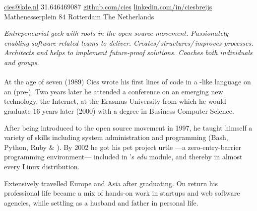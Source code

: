 \documentclass[10pt,a4paper]{article}
\begin{document}
    \sloppy  %
    
    
    
    \nobreakvspace{0.3em}  %
    
    \noindent\href{mailto:cies.at.kde.dot.nl}{cies\mbox{}@\mbox{}kde.nl}\sbull
    \textsmaller{+}31.646469087\sbull
    \href{https://github.com/cies}{github.com/cies}\sbull
    \href{http://linkedin.com/in/ciesbreijs}{linkedin.com/in/ciesbreijs}
    \\
    Mathenesserplein 84\sbull
    Rotterdam\sbull
    The Netherlands
    
    \spacedhrule{0.9em}{-0.4em}  %
    
    
    \vspace{-1.3em}  %
    \begin{multicols}{2}  %
    \noindent \emph{Entrepeneurial geek with roots in the open source movement. Passionately enabling software-related teams to deliver. Creates/\,structures/\,improves processes. Architects and helps to implement future-proof solutions. Coaches both individuals and groups.}
    \\
    \\
    At the age of seven (1989) Cies wrote his first lines of code in a -like language on an  (pre-).  Two years later he attended a conference on an emerging new technology, the Internet, at the Erasmus University from which he would graduate 16 years later (2000) with a degree in Business Computer Science.
    
    After being introduced to the open source movement in 1997, he taught himself a variety of skills including system administration and programming (Bash, Python, Ruby \& \CPP).  By 2002 he got his pet project urtle ---a zero-entry-barrier programming environment--- included in 's \emph{edu} module, and thereby in almost every Linux distribution.
    
    Extensively travelled Europe and Asia after graduating. On return his professional life became a mix of hands-on work in startups and web software agencies, while settling as a husband and father in personal life.
    \end{multicols}
    
\end{document}
